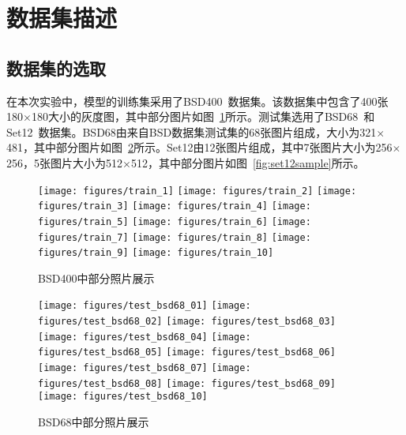 \section{数据集描述}

\subsection{数据集的选取}
在本次实验中，模型的训练集采用了BSD400~\cite{chen2016trainable}数据集。该数据集中包含了400张180$\times$180大小的灰度图，其中部分图片如图~\ref{fig:bsd400sample}所示。测试集选用了BSD68~\cite{roth2005fields}和Set12~\cite{zhang2017beyond}数据集。BSD68由来自BSD数据集测试集的68张图片组成，大小为321$\times$481，其中部分图片如图~\ref{fig:bsd68sample}所示。Set12由12张图片组成，其中7张图片大小为256$\times$256，5张图片大小为512$\times$512，其中部分图片如图~\ref{fig:set12sample}所示。

\begin{figure}
	\centering
	\subcaptionbox*{}
	{\texttt{[image: figures/train\_1]}}
	\subcaptionbox*{}
	{\texttt{[image: figures/train\_2]}}
	\subcaptionbox*{}
	{\texttt{[image: figures/train\_3]}}
	\subcaptionbox*{}
	{\texttt{[image: figures/train\_4]}}
	\subcaptionbox*{}
	{\texttt{[image: figures/train\_5]}}
	\subcaptionbox*{}
	{\texttt{[image: figures/train\_6]}}
	\subcaptionbox*{}
	{\texttt{[image: figures/train\_7]}}
	\subcaptionbox*{}
	{\texttt{[image: figures/train\_8]}}
	\subcaptionbox*{}
	{\texttt{[image: figures/train\_9]}}
	\subcaptionbox*{}
	{\texttt{[image: figures/train\_10]}}
	\caption{BSD400中部分照片展示}
	\label{fig:bsd400sample}
\end{figure}

\begin{figure}
	\centering
	\subcaptionbox*{}
	{\texttt{[image: figures/test\_bsd68\_01]}}
	\subcaptionbox*{}
	{\texttt{[image: figures/test\_bsd68\_02]}}
	\subcaptionbox*{}
	{\texttt{[image: figures/test\_bsd68\_03]}}
	\subcaptionbox*{}
	{\texttt{[image: figures/test\_bsd68\_04]}}
	\subcaptionbox*{}
	{\texttt{[image: figures/test\_bsd68\_05]}}
	\subcaptionbox*{}
	{\texttt{[image: figures/test\_bsd68\_06]}}
	\subcaptionbox*{}
	{\texttt{[image: figures/test\_bsd68\_07]}}
	\subcaptionbox*{}
	{\texttt{[image: figures/test\_bsd68\_08]}}
	\subcaptionbox*{}
	{\texttt{[image: figures/test\_bsd68\_09]}}
	\subcaptionbox*{}
	{\texttt{[image: figures/test\_bsd68\_10]}}
	\caption{BSD68中部分照片展示}
	\label{fig:bsd68sample}
\end{figure}

